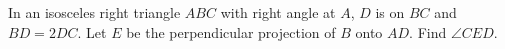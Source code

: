 In an isosceles right triangle $ABC$ with right angle at $A$, $D$ is on $BC$ and $BD=2DC$. Let $E$ be the perpendicular projection of $B$ onto $AD$. Find $\angle CED$.
